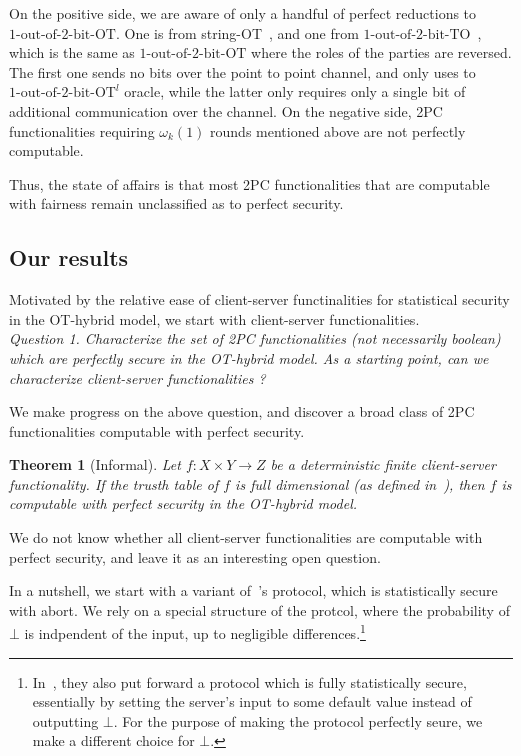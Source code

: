 \documentclass[a4paper]{article}
\newtheorem{theorem}{Theorem}[section]
\newcommand{\OT}[2]{#1\text{-out-of-}#2\text{-bit-OT}}
\newcommand{\TO}[2]{#1\text{-out-of-}#2\text{-bit-TO}}
\begin{document}
On the positive side, we are aware of only a handful of perfect reductions to $\OT{1}{2}$. One is from string-OT~\cite{BCS96}, and one from $\TO{1}{2}$~\cite{WolfW06}, which is the same as $\OT{1}{2}$ where the roles of the parties are reversed. The first one sends no bits over the point to point channel, and only uses to ${\OT{1}{2}}^l$ oracle, while the latter only requires only a single bit of additional communication over the channel.
On the negative side, 2PC functionalities requiring $\omega_k(1)$ rounds mentioned above are not perfectly computable. 

Thus, the state of affairs is that most 2PC functionalities that are computable with fairness remain unclassified as to perfect security. 

\subsection{Our results}

Motivated by the relative ease of client-server functinalities for statistical security in the OT-hybrid model, we start with client-server functionalities.\\

\emph{Question 1. Characterize the set of 2PC functionalities (not necessarily boolean) which are perfectly secure in the OT-hybrid model.
As a starting point, can we characterize client-server functionalities ?}
 
We make progress on the above question, and discover a broad class of 2PC functionalities computable with perfect security.

\begin{theorem}[Informal]
	Let $f:X\times Y\rightarrow Z$ be a deterministic finite client-server functionality. If the trusth table of $f$ is full dimensional (as defined in~\cite{Ash14}), then $f$ is computable with perfect security in the OT-hybrid model.
\end{theorem}

We do not know whether all client-server functionalities are computable with perfect security, and leave it as an interesting open question.

In a nutshell, we start with a variant of~\cite{IKOPS11}'s protocol, which is statistically secure with abort. We rely on a special structure of the protcol, where the probability of $\bot$ is indpendent of the input, up to negligible differences.\footnote{In~\cite{IKOPS11},
they also put forward a protocol which is fully statistically secure, essentially by setting the server's input to some default value instead of outputting $\bot$. For the purpose of making the protocol perfectly seure, we make a different choice for $\bot$.}
\end{document}
